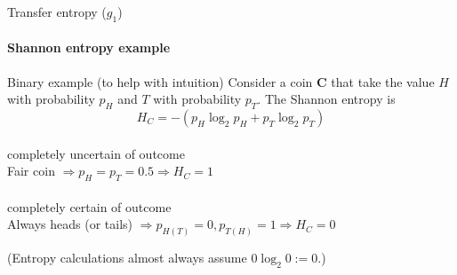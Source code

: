 \documentclass{beamer}
\begin{document}
\begin{frame}{Transfer entropy ($g_1$)}
\framesubtitle{Shannon entropy example}

\begin{exampleblock}{Binary example (to help with intuition)}
Consider a coin $\mathbf{C}$ that take the value $H$ with probability $p_H$ and $T$ with probability $p_T$.  The Shannon entropy is 
\begin{equation*}
H_C = -\left(p_H\log_2 p_H + p_T\log_2 p_T\right)
\end{equation*}
\pause
\hfill\\
\alert{completely uncertain of outcome}\\
\hspace{0.1in} Fair coin $\Rightarrow p_H=p_T=0.5\Rightarrow H_C = 1$\\
\pause
\hfill\\
\alert{completely certain of outcome}\\
\hspace{0.1in} Always heads (or tails) $\Rightarrow p_{H(T)}=0,p_{T(H)}=1\Rightarrow H_C = 0$\\
\end{exampleblock}
\pause
{\small (Entropy calculations almost always assume $0\log_2 0 := 0$.)}
\end{frame}
\end{document}
